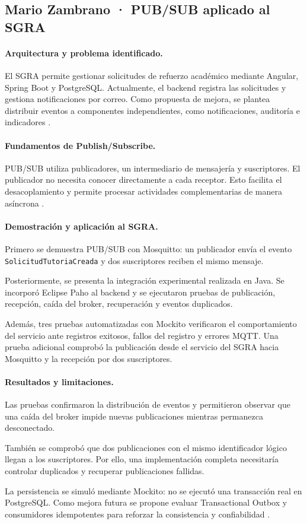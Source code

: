 \subsection{Mario Zambrano · PUB/SUB aplicado al SGRA}

\paragraph{Arquitectura y problema identificado.}
El SGRA permite gestionar solicitudes de refuerzo académico
mediante Angular, Spring Boot y PostgreSQL. Actualmente, el
backend registra las solicitudes y gestiona notificaciones
por correo. Como propuesta de mejora, se plantea distribuir
eventos a componentes independientes, como notificaciones,
auditoría e indicadores \cite{sgra_backend}.

\paragraph{Fundamentos de Publish/Subscribe.}
PUB/SUB utiliza publicadores, un intermediario de mensajería
y suscriptores. El publicador no necesita conocer directamente
a cada receptor. Esto facilita el desacoplamiento y permite
procesar actividades complementarias de manera asíncrona
\cite{lazidis2022}.

\paragraph{Demostración y aplicación al SGRA.}
Primero se demuestra PUB/SUB con Mosquitto: un publicador
envía el evento \texttt{SolicitudTutoriaCreada} y dos
suscriptores reciben el mismo mensaje.

Posteriormente, se presenta la integración experimental
realizada en Java. Se incorporó Eclipse Paho al backend y
se ejecutaron pruebas de publicación, recepción, caída del
broker, recuperación y eventos duplicados.

Además, tres pruebas automatizadas con Mockito verificaron
el comportamiento del servicio ante registros exitosos,
fallos del registro y errores MQTT. Una prueba adicional
comprobó la publicación desde el servicio del SGRA hacia
Mosquitto y la recepción por dos suscriptores.

\paragraph{Resultados y limitaciones.}
Las pruebas confirmaron la distribución de eventos y
permitieron observar que una caída del broker impide nuevas
publicaciones mientras permanezca desconectado.

También se comprobó que dos publicaciones con el mismo
identificador lógico llegan a los suscriptores. Por ello,
una implementación completa necesitaría controlar duplicados
y recuperar publicaciones fallidas.

La persistencia se simuló mediante Mockito: no se ejecutó
una transacción real en PostgreSQL. Como mejora futura se
propone evaluar Transactional Outbox y consumidores
idempotentes para reforzar la consistencia y confiabilidad
\cite{microsoft2026}.
